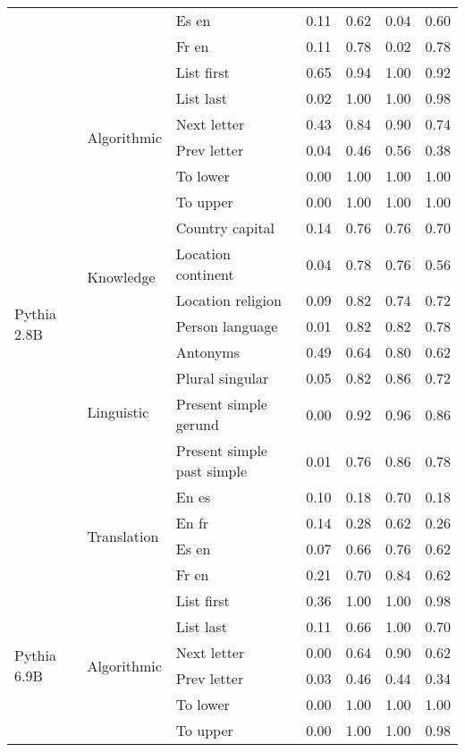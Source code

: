 \begin{center}
\begin{longtable}{lllrrrr}
 &  & Es en & 0.11 & 0.62 & 0.04 & 0.60 \\
 &  & Fr en & 0.11 & 0.78 & 0.02 & 0.78 \\
\cline{1-7} \cline{2-7}
\multirow[t]{18}{*}{Pythia 2.8B} & \multirow[t]{6}{*}{Algorithmic} & List first & 0.65 & 0.94 & 1.00 & 0.92 \\
 &  & List last & 0.02 & 1.00 & 1.00 & 0.98 \\
 &  & Next letter & 0.43 & 0.84 & 0.90 & 0.74 \\
 &  & Prev letter & 0.04 & 0.46 & 0.56 & 0.38 \\
 &  & To lower & 0.00 & 1.00 & 1.00 & 1.00 \\
 &  & To upper & 0.00 & 1.00 & 1.00 & 1.00 \\
\cline{2-7}
 & \multirow[t]{4}{*}{Knowledge} & Country capital & 0.14 & 0.76 & 0.76 & 0.70 \\
 &  & Location continent & 0.04 & 0.78 & 0.76 & 0.56 \\
 &  & Location religion & 0.09 & 0.82 & 0.74 & 0.72 \\
 &  & Person language & 0.01 & 0.82 & 0.82 & 0.78 \\
\cline{2-7}
 & \multirow[t]{4}{*}{Linguistic} & Antonyms & 0.49 & 0.64 & 0.80 & 0.62 \\
 &  & Plural singular & 0.05 & 0.82 & 0.86 & 0.72 \\
 &  & Present simple gerund & 0.00 & 0.92 & 0.96 & 0.86 \\
 &  & Present simple past simple & 0.01 & 0.76 & 0.86 & 0.78 \\
\cline{2-7}
 & \multirow[t]{4}{*}{Translation} & En es & 0.10 & 0.18 & 0.70 & 0.18 \\
 &  & En fr & 0.14 & 0.28 & 0.62 & 0.26 \\
 &  & Es en & 0.07 & 0.66 & 0.76 & 0.62 \\
 &  & Fr en & 0.21 & 0.70 & 0.84 & 0.62 \\
\cline{1-7} \cline{2-7}
\multirow[t]{18}{*}{Pythia 6.9B} & \multirow[t]{6}{*}{Algorithmic} & List first & 0.36 & 1.00 & 1.00 & 0.98 \\
 &  & List last & 0.11 & 0.66 & 1.00 & 0.70 \\
 &  & Next letter & 0.00 & 0.64 & 0.90 & 0.62 \\
 &  & Prev letter & 0.03 & 0.46 & 0.44 & 0.34 \\
 &  & To lower & 0.00 & 1.00 & 1.00 & 1.00 \\
 &  & To upper & 0.00 & 1.00 & 1.00 & 0.98 \\

\end{longtable}
\end{center}
